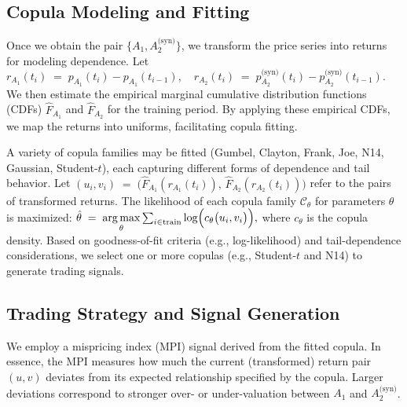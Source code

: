 \subsection{Copula Modeling and Fitting}
Once we obtain the pair $\{ A_1, A_2^\text{(syn)} \}$, we transform the price series into returns for modeling dependence. Let
$
   r_{A_1}(t_i) \;=\; p_{A_1}(t_i) - p_{A_1}(t_{i-1}), 
   \quad
   r_{A_2}(t_i) \;=\; p_{A_2}^\text{(syn)}(t_i) - p_{A_2}^\text{(syn)}(t_{i-1}).
$
We then estimate the empirical marginal cumulative distribution functions (CDFs) $\widehat{F}_{A_1}$ and $\widehat{F}_{A_2}$ for the training period. By applying these empirical CDFs, we map the returns into uniforms, facilitating copula fitting.

A variety of copula families may be fitted (Gumbel, Clayton, Frank, Joe, N14, Gaussian, Student-$t$), each capturing different forms of dependence and tail behavior. Let 
$
   (u_i, v_i) \;=\; \bigl(\widehat{F}_{A_1}(r_{A_1}(t_i)), \,\widehat{F}_{A_2}(r_{A_2}(t_i))\bigr)
$
refer to the pairs of transformed returns. The likelihood of each copula family $\mathcal{C}_\theta$ for parameters $\theta$ is maximized:
$
   \hat{\theta} 
   \;=\; 
   \underset{\theta}{\arg\max}
   \sum_{i \in \text{train}} 
   \log \Bigl( c_\theta\bigl(u_i, v_i\bigr) \Bigr),
$
where $c_\theta$ is the copula density. Based on goodness-of-fit criteria (e.g., log-likelihood) and tail-dependence considerations, we select one or more copulas (e.g., Student-$t$ and N14) to generate trading signals.

\subsection{Trading Strategy and Signal Generation}
We employ a mispricing index (MPI) signal derived from the fitted copula. In essence, the MPI measures how much the current (transformed) return pair $(u, v)$ deviates from its expected relationship specified by the copula. Larger deviations correspond to stronger over- or under-valuation between $A_1$ and $A_2^\text{(syn)}$. 

